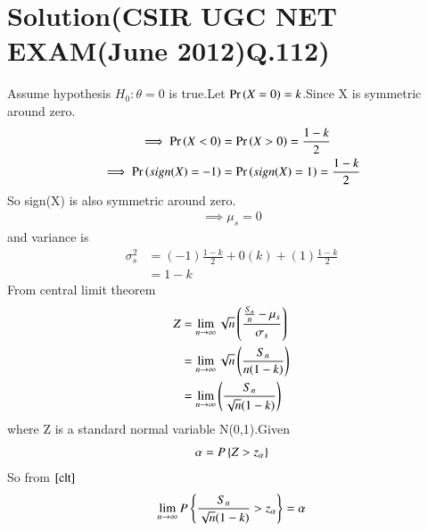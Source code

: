 \documentclass[journal,12pt,twocolumn]{IEEEtran}
\begin{document}
\section{Solution(CSIR UGC NET EXAM(June 2012)Q.112)}
Assume hypothesis
$H_0:\theta=0$
is true.Let $\Pr\left(X=0\right) =k$.Since X is symmetric around zero.
\begin{align}
    \implies \Pr\left(X<0\right)&=\Pr\left(X>0\right)=\frac{1-k}{2}\\
\implies \Pr\left(sign(X)=-1\right)&=\Pr\left(sign(X)=1\right)=\frac{1-k}{2}
\end{align}
So sign(X) is also symmetric around zero.
\begin{align}
   \implies \mu_s = 0 
\end{align}
and variance is
\begin{align}
    \sigma_s^2 &= (-1)\frac{1-k}{2}+0(k)+(1)\frac{1-k}{2}\\
    &=1-k
\end{align}
From central limit theorem 
\begin{align}
    Z&=\lim_{n\to\infty}\sqrt{n}\left(\frac{\frac{S_n}{n}-\mu_s}{\sigma_s}\right)\\
    &=\lim_{n\to\infty}\sqrt{n}\left(\frac{S_n}{n(1-k)}\right)\\
    &=\lim_{n\to\infty}\left(\frac{S_n}{\sqrt{n}(1-k)}\right)
    \label{clt}
\end{align}
where Z is a standard normal variable N(0,1).Given
\begin{align}
    \alpha = P\left\{Z>z_\alpha\right\}
\end{align}
So from $\eqref{clt}$
\begin{align}
\lim_{n\to\infty}P\left\{\frac{S_n}{\sqrt{n}(1-k)}>z_\alpha\right\}=\alpha
\end{align}
\end{document}
